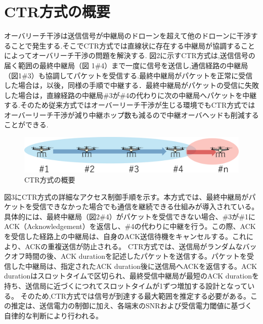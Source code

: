\documentclass[a4paper,10pt]{ltjsarticle}
\begin{document}
\section{CTR方式の概要}
オーバリーチ干渉は送信信号が中継局のドローンを超えて他のドローンに干渉することで発生する.そこでCTR方式では直線状に存在する中継局が協調することによってオーバリーチ干渉の問題を解決する.
図2に示すCTR方式は,送信信号の届く範囲の最終中継局（図 1\#4）まで一度に信号を送信し,通信経路の中継局（図1\#3）も協調してパケットを受信する.最終中継局がパケットを正常に受信した場合は，以後，同様の手順で中継する．最終中継局がパケットの受信に失敗した場合は，直線経路の中継局\#3が\#4の代わりに次の中継局へパケットを中継する.そのため従来方式ではオーバーリーチ干渉が生じる環境でもCTR方式ではオーバーリーチ干渉が減り中継ホップ数も減るので中継オーバヘッドも削減することができる.
\begin{figure}[H]
  \centering
  \includegraphics[width=\linewidth]{CTR_topology.pdf} %
  \caption{CTR方式の概要}
  \label{fig:CTR方式のトポロジー} %
\end{figure}
図3にCTR方式の詳細なアクセス制御手順を示す。本方式では、最終中継局がパケットを受信できなかった場合でも通信を継続できる仕組みが導入されている。具体的には、最終中継局（図2\#4）がパケットを受信できない場合、\#3が\#1にACK（Acknowledgement）を返信し、\#4の代わりに中継を行う。この際、ACKを受信した経路上の中継局は、自身のACK送信待機をキャンセルする。これにより、ACKの重複送信が防止される。
CTR方式では、送信局がランダムなバックオフ時間の後、ACK durationを記述したパケットを送信する。パケットを受信した中継局は、指定されたACK duration後に送信局へACKを返信する。ACK durationはスロットタイムで区切られ、最終受信中継局が最短のACK durationを持ち、送信局に近づくにつれてスロットタイムが1ずつ増加する設計となっている。
そのため,CTR方式では信号が到達する最大範囲を推定する必要がある。この推定は、送信電力の制御に加え、各端末のSNRおよび受信電力閾値に基づく自律的な判断により行われる。
\end{document}
